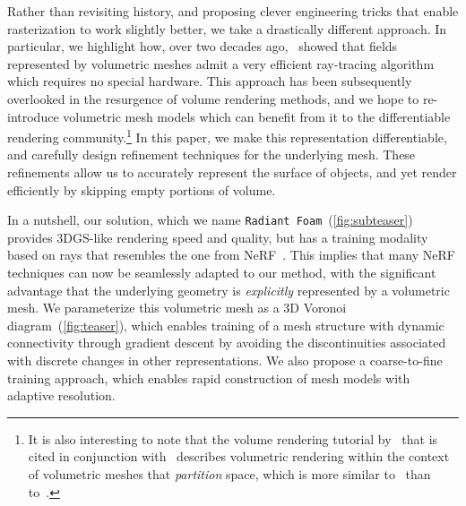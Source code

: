 Rather than revisiting history, and proposing clever engineering tricks that enable rasterization to work slightly better, we take a drastically different approach.
In particular, we highlight how, over two decades ago,~\citet{ray_plane} showed that fields represented by volumetric meshes admit a very efficient ray-tracing algorithm which requires no special hardware.
This approach has been subsequently overlooked in the resurgence of volume rendering methods, and we hope to re-introduce volumetric mesh models which can benefit from it to the differentiable rendering community.\footnote{It is also interesting to note that the volume rendering tutorial by~\citet{max05} that is cited in conjunction with~\citet{nerf} describes volumetric rendering within the context of volumetric meshes that \textit{partition} space, which is more similar to~\cite{fastray} than to~\cite{nerf}.}
In this paper, we make this representation differentiable, and carefully design refinement techniques for the underlying mesh.
These refinements allow us to accurately represent the surface of objects, and yet render efficiently by skipping empty portions of volume.

In a nutshell, our solution, which we name \texttt{Radiant Foam}~(\cref{fig:subteaser}) provides 3DGS-like rendering speed and quality, but has a training modality based on rays that resembles the one from NeRF~\cite{nerf}.
This implies that many NeRF techniques can now be seamlessly adapted to our method, with the significant advantage that the underlying geometry is \textit{explicitly} represented by a volumetric mesh.
We parameterize this volumetric mesh as a 3D Voronoi diagram~(\cref{fig:teaser}), which enables training of a mesh structure with dynamic connectivity through gradient descent by avoiding the discontinuities associated with discrete changes in other representations.
We also propose a coarse-to-fine training approach, which enables rapid construction of mesh models with adaptive resolution.

